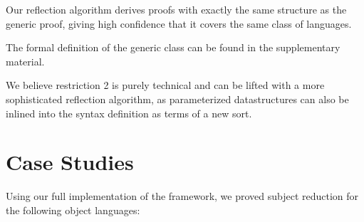 \documentclass[a4paper, UKenglish, cleveref, autoref, thm-restate]{lipics-v2021}
\begin{document}
  Our reflection algorithm derives proofs with exactly the same
  structure as the generic proof, giving high confidence that it covers
  the same class of languages.

  The formal definition of the generic class can be found in
  the supplementary material.

  We believe restriction 2 is purely technical and can be lifted
  with a more sophisticated reflection algorithm, as parameterized
  datastructures can also be inlined into the syntax definition as terms
  of a new sort.



  \section{Case Studies}
  \label{sec:casestudies}
  Using our full implementation of the framework, we proved subject
  reduction for the following object languages:
\end{document}
